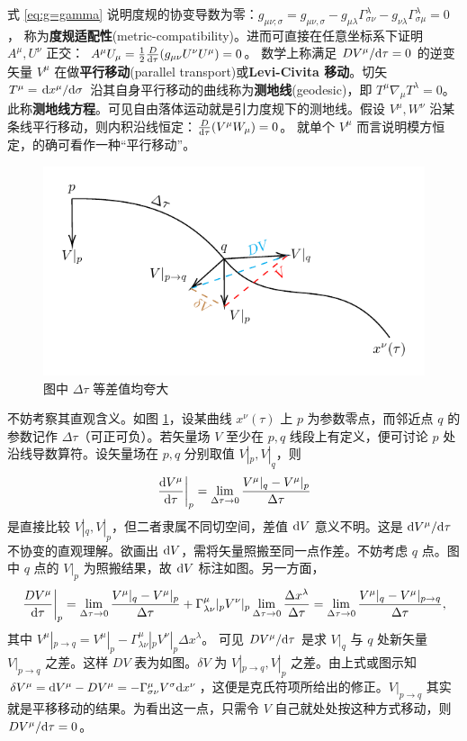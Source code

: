 式 \eqref{eq:g=gamma} 说明度规的协变导数为零：$g_{\mu\nu;\sigma}= {g_{\mu\nu,\sigma}}-g_{\mu\lambda}\Gamma^\lambda_{\sigma\nu}-g_{\nu\lambda}\Gamma^\lambda_{\sigma\mu}=0$，
称为\textbf{度规适配性}(metric-compatibility)。进而可直接在任意坐标系下证明 $A^\mu,U^\nu$ 正交： $A^\mu U_\mu=\frac 12  \frac{D}{\dd\tau} (g_{\mu\nu} U^\nu U^\mu)=0$。
数学上称满足 $D V^\mu/\dd\tau=0$ 的逆变矢量 $V^\mu$ 在做\textbf{平行移动}(parallel transport)或\textbf{Levi-Civita 移动}。切矢 $T^\mu=\dv*{x^\mu}{\sigma}$ 沿其自身平行移动的曲线称为\textbf{测地线}(geodesic)，即 $T^\mu\nabla_\mu T^\lambda =0$。
此称\textbf{测地线方程}。可见自由落体运动就是引力度规下的测地线。假设 $V^\mu,W^\nu$ 沿某条线平行移动，则内积沿线恒定：$\frac{D}{\dd\tau}(V^\mu W_\mu)=0$。
就单个 $V^\mu$ 而言说明模方恒定，的确可看作一种“平行移动”。
\begin{figure}[ht]\centering
\includegraphics[width=.6\textwidth]{fig/chpt01/covar-deri.pdf}
    \caption{图中 $\Delta\tau$ 等差值均夸大}\label{covar-deri}
\end{figure}
不妨考察其直观含义。如图 \ref{covar-deri}，设某曲线 $x^\nu(\tau)$ 上 $p$ 为参数零点，而邻近点 $q$ 的参数记作 $\Delta\tau$（可正可负）。若矢量场 $ V$ 至少在 $p,q$ 线段上有定义，便可讨论 $p$ 处沿线导数算符。设矢量场在 $p,q$ 分别取值 $ V|_p, V|_q$，则
\[\eval{\dv{V^\mu}{\tau}}_p=\lim_{\Delta\tau\to 0}\frac{V^\mu|_q-V^\mu|_p}{\Delta\tau}\]
是直接比较 $V|_q,V|_p$，但二者隶属不同切空间，差值 $\dd V$ 意义不明。这是 $\dd V^\mu/\dd\tau$ 不协变的直观理解。欲画出 $\dd V$，需将矢量照搬至同一点作差。不妨考虑 $q$ 点。图中 $q$ 点的 $V|_p$ 为照搬结果，故 $\dd V$ 标注如图。另一方面，
\[\eval{\frac{DV^\mu}{\d\tau}}_p=\lim_{\Delta\tau\to 0}\frac{V^\mu|_q-V^\mu|_p}{\Delta\tau}+\Gamma^\mu_{\lambda\nu}|_p  V^\nu|_p \lim_{\Delta\tau\to 0} \frac{\Delta x^\lambda}{\Delta\tau}=\lim_{\Delta\tau\to 0}\frac{V^\mu|_q-V^\mu|_{p\to q}}{\Delta\tau},\]
其中 $V^\mu|_{p\to q}=V^\mu|_p-\Gamma^\mu_{\lambda\nu}|_p  V^\nu|_p \Delta x^\lambda$。
可见 $DV^\mu/\dd\tau$ 是求 $V|_q$ 与 $q$ 处新矢量 $V|_{p\to q}$ 之差。这样 $D V$ 表为如图。$\delta V$ 为 $V|_{p\to q}, V|_p$ 之差。由上式或图示知 $\delta V^\mu = \dd V^\mu-D V^\mu=-\Gamma^\mu_{\sigma\nu}V^\sigma\dd x^\nu$，这便是克氏符项所给出的修正。$V|_{p\to q}$ 其实就是平移移动的结果。为看出这一点，只需令 $V$ 自己就处处按这种方式移动，则 $D V^\mu/\dd\tau=0$。

